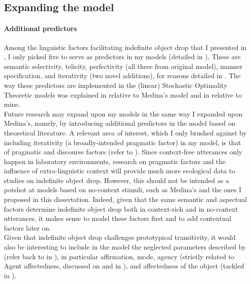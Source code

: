\subsection{Expanding the model} 

\paragraph{Additional predictors}

Among the linguistic factors facilitating indefinite object drop that I presented in , I only picked five to serve as predictors in my models (detailed in ). These are semantic selectivity, telicity, perfectivity (all three from  original model), manner specification, and iterativity (two novel additions), for reasons detailed in . The way these predictors are implemented in the (linear) Stochastic Optimality Theoretic models was explained in  relative to Medina's model and in  relative to mine.\\
Future research may expand upon my models in the same way I expanded upon Medina's, namely, by introducing additional predictors in the model based on theoretical literature. A relevant area of interest, which I only brushed against by including iterativity (a broadly-intended pragmatic factor) in my model, is that of pragmatic and discourse factors (refer to ). Since context-free utterances only happen in laboratory environments, research on pragmatic factors and the influence of extra-linguistic context will provide much more ecological data to studies on indefinite object drop. However, this should not be intended as a potshot at models based on no-context stimuli, such as Medina's and the ones I proposed in this dissertation. Indeed, given that the same semantic and aspectual factors determine indefinite object drop both in context-rich and in no-context utterances, it makes sense to model these factors first and to add contextual factors later on.\\
Given that indefinite object drop challenges prototypical transitivity, it would also be interesting to include in the model the neglected parameters described by \textcite{HopperThompson1980} (refer back to  in ), in particular affirmation, mode, agency (strictly related to Agent affectedness, discussed on  and in ), and affectedness of the object (tackled in ).

